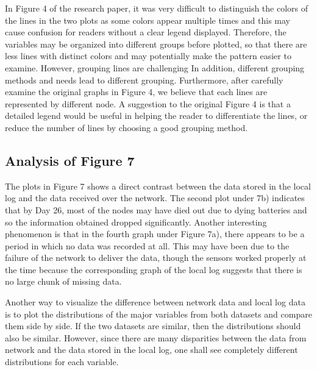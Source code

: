 \documentclass[twocolumn,11pt]{asme2ej}
\begin{document}
In Figure 4 of the research paper, it was very difficult to distinguish the colors of the lines in the two plots as some colors appear multiple times and this may cause confusion for readers without a clear legend displayed. Therefore, the variables may be organized into different groups before plotted, so that there are less lines with distinct colors and may potentially make the pattern easier to examine. However, grouping lines are challenging In addition, different grouping methods and needs lead to different grouping. Furthermore, after carefully examine the original graphs in Figure 4, we believe that each lines are represented by different node. A suggestion to the original Figure 4 is that a detailed legend would be useful in helping the reader to differentiate the lines, or reduce the number of lines by choosing a good grouping method.

\subsection{Analysis of Figure 7}

The plots in Figure 7 shows a direct contrast between the data stored in the local log and the data received over the network. The second plot under 7b) indicates that by Day 26, most of the nodes may have died out due to dying batteries and so the information obtained dropped significantly. Another interesting phenomenon is that in the fourth graph under Figure 7a), there appears to be a period in which no data was recorded at all. This may have been due to the failure of the network to deliver the data, though the sensors worked properly at the time because the corresponding graph of the local log suggests that there is no large chunk of missing data. 

Another way to visualize the difference between network data and local log data is to plot the distributions of the major variables from both datasets and compare them side by side. If the two datasets are similar, then the distributions should also be similar. However, since there are many disparities between the data from network and the data stored in the local log, one shall see completely different distributions for each variable. 

\end{document}
